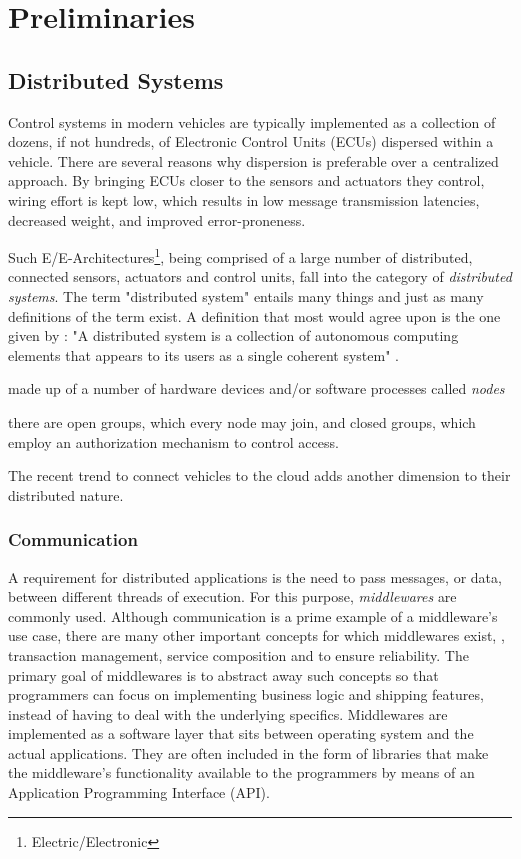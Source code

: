 

\chapter{Preliminaries}\label{chapter:preliminaries}


\section{Distributed Systems}

Control systems in modern vehicles are typically implemented as a collection of dozens, if not hundreds, of Electronic Control Units (ECUs) dispersed within a vehicle. There are several reasons why dispersion is preferable over a centralized approach. By bringing ECUs closer to the sensors and actuators they control, wiring effort is kept low, which results in low message transmission latencies, decreased weight, and improved error-proneness. 

Such E/E-Architectures\footnote{Electric/Electronic}, being comprised of a large number of distributed, connected sensors, actuators and control units, fall into the category of \emph{distributed systems}. The term "distributed system" entails many things and just as many definitions of the term exist. A definition that most would agree upon is the one given by \citeauthor*{tanenbaum2017distributed}: "A distributed system is a collection of autonomous computing elements that appears to its users as a single coherent system" \cite{tanenbaum2017distributed}.


made up of a number of hardware devices and/or software processes called \emph{nodes}

there are open groups, which every node may join, and closed groups, which employ an authorization mechanism to control access.

The recent trend to connect vehicles to the cloud adds another dimension to their distributed nature.

\subsection{Communication}
A requirement for distributed applications is the need to pass messages, or data, between different threads of execution. For this purpose, \emph{middlewares} \cite{bernstein1996middleware} are commonly used. Although communication is a prime example of a middleware's use case, there are many other important concepts for which middlewares exist, \eg , transaction management, service composition and to ensure reliability. The primary goal of middlewares is to abstract away such concepts so that programmers can focus on implementing business logic and shipping features, instead of having to deal with the underlying specifics. Middlewares are implemented as a software layer that sits between operating system and the actual applications. They are often included in the form of libraries that make the middleware's functionality available to the programmers by means of an Application Programming Interface (API).


